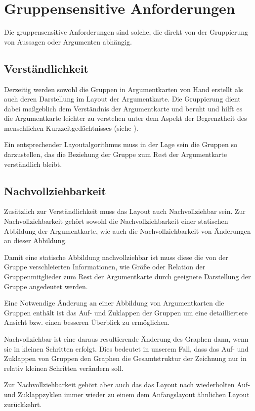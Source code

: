 \section{Gruppensensitive Anforderungen}
\label{sec:groupreq}
Die gruppensensitive Anforderungen sind solche, die direkt von der Gruppierung von Aussagen oder Argumenten abhängig.

\subsection{Verständlichkeit}
Derzeitig werden sowohl die Gruppen in Argumentkarten von Hand erstellt als auch deren Darstellung im Layout der Argumentkarte. Die Gruppierung dient dabei maßgeblich dem Verständnis der Argumentkarte und beruht und hilft es die Argumentkarte leichter zu verstehen unter dem Aspekt der Begrenztheit des menschlichen Kurzzeitgedächtnisses (siehe \cite{miller1956magical, BBS:84441}).

Ein entsprechender Layoutalgorithmus muss in der Lage sein die Gruppen so darzustellen, das die Beziehung der Gruppe zum Rest der Argumentkarte verständlich bleibt.

\subsection{Nachvollziehbarkeit}
Zusätzlich zur Verständlichkeit muss das Layout auch Nachvollziehbar sein. Zur Nachvollziehbarkeit gehört sowohl die Nachvollziehbarkeit einer statischen Abbildung der Argumentkarte, wie auch die Nachvollziehbarkeit von Änderungen an dieser Abbildung.

Damit eine statische Abbildung nachvollziehbar ist muss diese die von der Gruppe verschleierten Informationen, wie Größe oder Relation der Gruppenmitglieder zum Rest der Argumentkarte durch geeignete Darstellung der Gruppe angedeutet werden.

Eine Notwendige Änderung an einer Abbildung von Argumentkarten die Gruppen enthält ist das Auf- und Zuklappen der Gruppen um eine detailliertere Ansicht bzw. einen besseren Überblick zu ermöglichen.

Nachvollziehbar ist eine daraus resultierende Änderung des Graphen dann, wenn sie in kleinen Schritten erfolgt. Dies bedeutet in unserem Fall, dass das Auf- und Zuklappen von Gruppen den Graphen die Gesamtstruktur der Zeichnung nur in relativ kleinen Schritten verändern soll.

Zur Nachvollziehbarkeit gehört aber auch das das Layout nach wiederholten Auf- und Zuklappzyklen immer wieder zu einem dem Anfangslayout ähnlichen Layout zurückkehrt.

